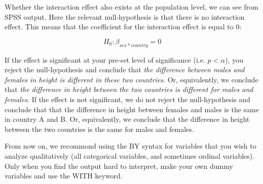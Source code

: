 \documentclass[]{report}\usepackage[]{graphicx}\usepackage[]{color}
\makeatletter
\newenvironment{kframe}{%
 \def\at@end@of@kframe{}%
 \ifinner\ifhmode%
  \def\at@end@of@kframe{\end{minipage}}%
  \begin{minipage}{\columnwidth}%
 \fi\fi%
 \def\FrameCommand##1{\hskip\@totalleftmargin \hskip-\fboxsep
 \colorbox{shadecolor}{##1}\hskip-\fboxsep
     \hskip-\linewidth \hskip-\@totalleftmargin \hskip\columnwidth}%
 \MakeFramed {\advance\hsize-\width
   \@totalleftmargin\z@ \linewidth\hsize
   \@setminipage}}%
 {\par\unskip\endMakeFramed%
 \at@end@of@kframe}
\newenvironment{knitrout}{}{} %
\makeatother
\begin{document}
\begin{knitrout}
\color{fgcolor}\begin{kframe}


{\ttfamily\noindent\bfseries\color{errorcolor}{\#\# Error in filter\_impl(.data, quo): Evaluation error: object 'country' not found.}}\end{kframe}
\end{knitrout}


Whether the interaction effect also exists at the population level, we can see from SPSS output. Here the relevant null-hypothesis is that there is no interaction effect. This means that the coefficient for the interaction effect is equal to 0:


\begin{equation}
H_0: \beta_{sex*country}=0
\end{equation}

If the effect is significant at your pre-set level of significance (i.e. $p < \alpha$), you reject the null-hypothesis and conclude that \textit{the difference between males and females in height is different in these two countries}. Or, equivalently, we conclude that \textit{the difference in height between the two countries is different for males and females}. If the effect is not significant, we do not reject the null-hypothesis and conclude that that the difference in height between females and males is the same in country A and B. Or, equivalently, we conclude that the difference in height between the two countries is the same for males and females.




From now on, we recommond using the BY syntax for variables that you wish to analyze qualitatively (all categorical variables, and sometimes ordinal variables). Only when you find the output hard to interpret, make your own dummy variables and use the WITH keyword.
\end{document}
